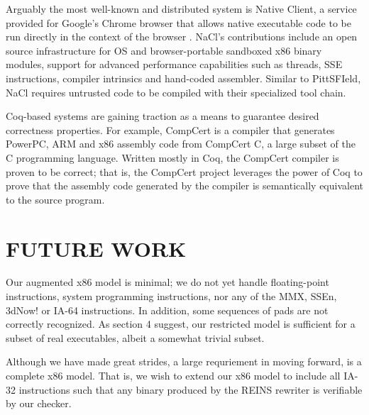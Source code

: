 \documentclass[conference]{IEEEtran}
\begin{document}
Arguably the most well-known and distributed system is Native Client, a service provided for Google's Chrome browser that allows native executable code to be run directly in the context of the browser \cite{Yee09nativeclient:}.
NaCl's contributions include an open source infrastructure for OS and browser-portable sandboxed x86 binary modules, support for advanced performance capabilities such as threads, SSE instructions, compiler intrinsics and hand-coded assembler.  
Similar to PittSFIeld, NaCl requires untrusted code to be compiled with their specialized tool chain.  


Coq-based systems are gaining traction as a means to guarantee desired correctness properties.
For example, CompCert is a compiler that generates PowerPC, ARM and x86 assembly code from CompCert C, a large subset of the C programming language.
Written mostly in Coq, the CompCert compiler is proven to be correct; that is, the CompCert project leverages the power of Coq to prove that the assembly code generated by the compiler is semantically equivalent to the source program.




\section{FUTURE WORK}

Our augmented x86 model is minimal; we do not yet handle floating-point instructions, system programming instructions, nor any of the MMX, SSEn, 3dNow! or IA-64 instructions.
In addition, some sequences of pads are not correctly recognized.
As section 4 suggest, our restricted model is sufficient for a subset of real executables, albeit a somewhat trivial subset.

Although we have made great strides, a large requriement in moving forward, is a complete x86 model.  
That is, we wish to extend our x86 model to include all IA-32 instructions such that any binary produced by the REINS rewriter is verifiable by our checker. 
\end{document}
